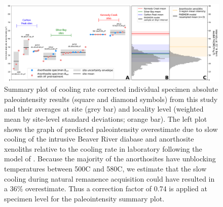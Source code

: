 \documentclass[9pt,twocolumn,twoside,lineno]{pnas-new}
\begin{document}
\begin{figure}[h!]
\noindent\includegraphics[width=\textwidth]{Paleointensity_plot_cooling_corrected.pdf}
\centering
\caption{\small{Summary plot of cooling rate corrected individual specimen absolute paleointensity results (square and diamond symbols) from this study and their averages at site (grey bar) and locality level (weighted mean by site-level standard deviations; orange bar). The left plot shows the graph of predicted paleointensity overestimate due to slow cooling of the intrusive Beaver River diabase and anorthosite xenoliths relative to the cooling rate in laboratory following the model of . Because the majority of the anorthosites have unblocking temperatures between 500\textdegree C and 580\textdegree C, we estimate that the slow cooling during natural remanence acquisition could have resulted in a 36\% overestimate. Thus a correction factor of 0.74 is applied at specimen level for the paleointensity summary plot.  }}
\label{fig:PINT_cooling_corrected}
\end{figure}
\end{document}
